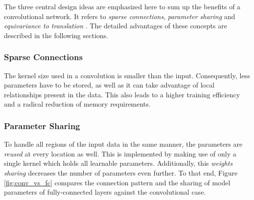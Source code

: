 The three central design ideas are emphasized here to sum up the benefits of a convolutional network. It refers to \textit{sparse connections}, \textit{parameter sharing} and \textit{equivariance to translation} \parencite[p. 336ff.]{deep_learning}. The detailed advantages of these concepts are described in the following sections.

\subsubsection*{Sparse Connections}
The kernel size used in a convolution is smaller than the input. Consequently, less parameters have to be stored, as well as it can take advantage of local relationships present in the data. This also leads to a higher training efficiency and a radical reduction of memory requirements.

\subsubsection*{Parameter Sharing}
To handle all regions of the input data in the same manner, the parameters are \textit{reused} at every location as well. This is implemented by making use of only a single kernel which holds all learnable parameters.  Additionally, this \textit{weights sharing} decreases the number of parameters even further. To that end, Figure \ref{fig:conv_vs_fc} compares the connection pattern  and the sharing of model parameters of fully-connected layers against the convolutional case.


